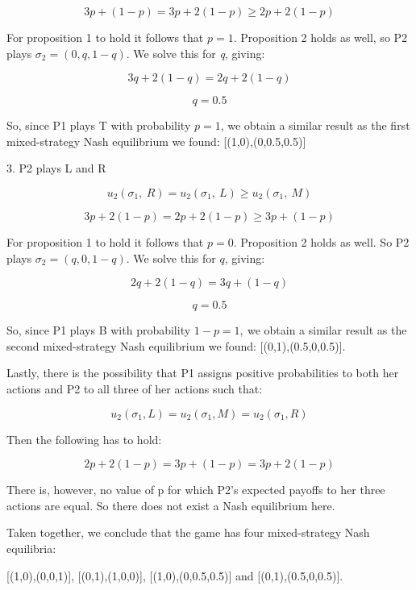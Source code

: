 \documentclass[a4paper]{article}
\begin{document}
\[3p + \left( 1 - p \right) = 3p + 2\left( 1 - p \right) \geq 2p + 2\left( 1 - p \right)\]

For proposition 1 to hold it follows that \(p = 1\). Proposition 2 holds
as well, so P2 plays \(\sigma_{2} = (0,q,1 - q)\). We solve this for
\emph{q}, giving:

\[3q + 2\left( 1 - q \right) = 2q + 2\left( 1 - q \right)\]

\[q = 0.5\]

So, since P1 plays T with probability \(p = 1\), we obtain a similar
result as the first mixed-strategy Nash equilibrium we found:
{[}(1,0),(0,0.5,0.5){]}

3. P2 plays L and R

\[u_{2}\left( \sigma_{1},\ R \right) = u_{2}\left( \sigma_{1},\ L \right) \geq u_{2}(\sigma_{1},\ M)\]

\[3p + 2\left( 1 - p \right) = 2p + 2\left( 1 - p \right) \geq 3p + (1 - p)\]

For proposition 1 to hold it follows that \(p = 0\). Proposition 2 holds
as well. So P2 plays \(\sigma_{2} = (q,0,1 - q)\). We solve this for $q$,
giving:

\[2q + 2\left( 1 - q \right) = 3q + \left( 1 - q \right)\]

\[q = 0.5\]

So, since P1 plays B with probability \(1-p = 1,\ \)we obtain a similar
result as the second mixed-strategy Nash equilibrium we found:
{[}(0,1),(0.5,0,0.5){]}.

Lastly, there is the possibility that P1 assigns positive probabilities
to both her actions and P2 to all three of her actions such that:

\[u_{2}\left( \sigma_{1},L \right) = u_{2}\left( \sigma_{1},M \right) = u_{2}(\sigma_{1},R)\]

Then the following has to hold:

\[2p + 2\left( 1 - p \right) = 3p + \left( 1 - p \right) = 3p + 2(1 - p)\]

There is, however, no value of \(\text{p\ }\)for which P2's expected
payoffs to her three actions are equal. So there does not exist a Nash
equilibrium here.

Taken together, we conclude that the game has four mixed-strategy Nash
equilibria:

{[}(1,0),(0,0,1){]}, {[}(0,1),(1,0,0){]}, {[}(1,0),(0,0.5,0.5){]} and
{[}(0,1),(0.5,0,0.5){]}.
\end{document}

